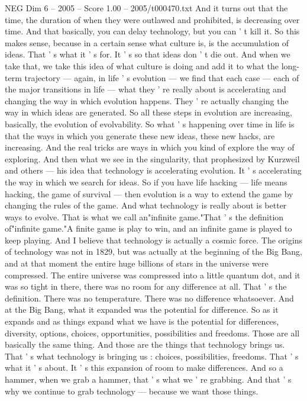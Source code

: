 \begin{textsample}{NEG Dim 6 – 2005 – Score 1.00 – 2005/t000470.txt}
And it turns out that the time, the duration of when they were outlawed and prohibited, is decreasing over time.
And that basically, you can delay technology, but you can ' t kill it.
So this makes sense, because in a certain sense what culture is, is the accumulation of ideas.
That ' s what it ' s for.
It ' s so that ideas don ' t die out.
And when we take that, we take this idea of what culture is doing and add it to what the long- term trajectory — again, in life ' s evolution — we find that each case — each of the major transitions in life — what they ' re really about is accelerating and changing the way in which evolution happens.
They ' re actually changing the way in which ideas are generated.
So all these steps in evolution are increasing, basically, the evolution of evolvability.
So what ' s happening over time in life is that the ways in which you generate these new ideas, these new hacks, are increasing.
And the real tricks are ways in which you kind of explore the way of exploring.
And then what we see in the singularity, that prophesized by Kurzweil and others — his idea that technology is accelerating evolution.
It ' s accelerating the way in which we search for ideas.
So if you have life hacking — life means hacking, the game of survival — then evolution is a way to extend the game by changing the rules of the game.
And what technology is really about is better ways to evolve.
That is what we call an"infinite game."That ' s the definition of"infinite game."A finite game is play to win, and an infinite game is played to keep playing.
And I believe that technology is actually a cosmic force.
The origins of technology was not in 1829, but was actually at the beginning of the Big Bang, and at that moment the entire huge billions of stars in the universe were compressed.
The entire universe was compressed into a little quantum dot, and it was so tight in there, there was no room for any difference at all.
That ' s the definition.
There was no temperature.
There was no difference whatsoever.
And at the Big Bang, what it expanded was the potential for difference.
So as it expands and as things expand what we have is the potential for differences, diversity, options, choices, opportunities, possibilities and freedoms.
Those are all basically the same thing.
And those are the things that technology brings us.
That ' s what technology is bringing us : choices, possibilities, freedoms.
That ' s what it ' s about.
It ' s this expansion of room to make differences.
And so a hammer, when we grab a hammer, that ' s what we ' re grabbing.
And that ' s why we continue to grab technology — because we want those things.

\end{textsample}
